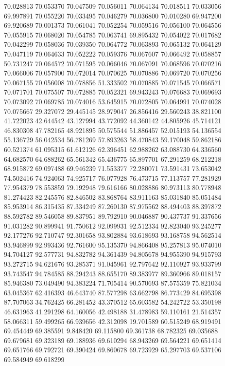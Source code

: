 70.028813
70.053370
70.047509
70.056011
70.064134
70.018511
70.033056
69.997891
70.055220
70.033495
70.046279
70.036800
70.010280
69.947200
69.920689
70.001373
70.061041
70.052254
70.059516
70.056100
70.064556
70.055915
70.068020
70.054785
70.063741
69.895432
70.054022
70.017682
70.042299
70.058036
70.039350
70.064772
70.063893
70.065132
70.064129
70.047119
70.064633
70.052222
70.059376
70.067607
70.066492
70.058857
50.731247
70.064572
70.071595
70.066046
70.067091
70.068596
70.070216
70.066006
70.057900
70.072014
70.070625
70.070886
70.069720
70.070256
70.067155
70.056008
70.078856
51.333502
70.070885
70.071545
70.066571
70.071701
70.075507
70.072885
70.052321
69.943243
70.076683
70.069693
70.073092
70.069785
70.074016
53.645915
70.072805
70.064991
70.074028
70.075667
29.327072
29.445145
28.979047
26.856416
29.560243
38.821100
41.722023
42.644542
43.127994
43.772092
44.360142
44.805926
45.714121
46.830308
47.782165
48.921895
50.575544
51.886457
52.015193
54.136554
55.136729
56.042534
56.781269
57.893263
58.470843
59.170048
59.862186
60.521374
61.095315
61.612126
62.396451
62.988262
63.088730
64.336560
64.682570
64.688262
65.561342
65.436775
65.897701
67.291259
68.212218
68.915872
69.097488
69.946239
71.553377
72.280071
73.591431
73.653042
74.502416
74.924063
74.925717
76.077928
76.473715
77.113757
77.281929
77.954379
78.553859
79.192948
79.616166
80.028886
80.973113
80.778948
81.274423
82.245576
82.846502
83.868764
83.911163
85.031840
85.051484
85.953914
86.315435
87.334249
87.260130
87.975562
88.494403
88.397872
88.592782
89.546058
89.837951
89.792910
90.046887
90.437737
91.337656
91.031282
90.899941
91.750612
92.099931
92.512334
92.823040
93.245277
92.177276
92.710747
92.301658
93.802884
93.618693
93.168758
94.562514
93.946899
92.993436
92.761600
95.135370
94.866408
95.257813
95.074010
94.704127
92.577731
94.832782
94.361439
94.805678
94.955390
94.915793
93.272715
94.621676
93.285371
91.045961
92.797642
92.110927
93.933799
93.743547
94.784585
88.294243
88.655170
89.383977
89.360966
89.018157
85.946380
73.049490
94.383224
71.705414
90.570693
87.575359
75.821034
63.045367
62.416393
46.643740
87.577298
63.662798
86.773429
84.695398
87.707063
34.762425
66.281452
43.370512
65.603582
54.242722
53.350198
46.631963
41.291298
64.160056
42.498188
31.478983
59.110161
21.514357
58.066311
59.499265
66.939656
42.312098
19.701589
60.515249
68.919491
69.454449
69.385591
9.848420
69.115800
69.361738
68.782325
69.035688
69.679681
69.323189
69.188936
69.610294
68.943269
69.564221
69.651414
69.651766
69.792721
69.390424
69.860678
69.723929
65.297703
69.537106
69.584949
69.618299
